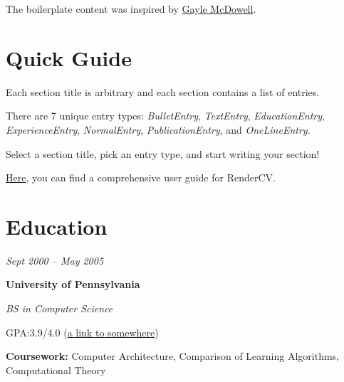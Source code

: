         \begin{onecolentry}
            The boilerplate content was inspired by \href{https://github.com/dnl-blkv/mcdowell-cv}{Gayle McDowell}.
        \end{onecolentry}


    
    \section{Quick Guide}

    \begin{onecolentry}
        \begin{highlightsforbulletentries}


        \item Each section title is arbitrary and each section contains a list of entries.

        \item There are 7 unique entry types: \textit{BulletEntry}, \textit{TextEntry}, \textit{EducationEntry}, \textit{ExperienceEntry}, \textit{NormalEntry}, \textit{PublicationEntry}, and \textit{OneLineEntry}.

        \item Select a section title, pick an entry type, and start writing your section!

        \item \href{https://docs.rendercv.com/user_guide/}{Here}, you can find a comprehensive user guide for RenderCV.\@


        \end{highlightsforbulletentries}
    \end{onecolentry}

    \section{Education}



        
        \begin{twocolentry}{
            
            
        \textit{Sept 2000 – May 2005}}
            \textbf{University of Pennsylvania}

            \textit{BS in Computer Science}
        \end{twocolentry}

        \vspace{0.10 cm}
        \begin{onecolentry}
            \begin{highlights}
                \item GPA:\@ 3.9/4.0 (\href{https://example.com}{a link to somewhere})
                \item \textbf{Coursework:} Computer Architecture, Comparison of Learning Algorithms, Computational Theory
            \end{highlights}
        \end{onecolentry}



